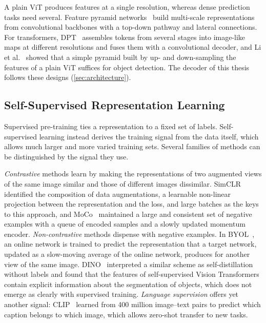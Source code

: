 A plain \acrshort{ViT} produces features at a single resolution, whereas dense prediction
tasks need several. Feature pyramid networks~\cite{lin2017feature} build
multi-scale representations from convolutional backbones with a top-down
pathway and lateral connections. For transformers, DPT~\cite{ranftl2021vision}
assembles tokens from several stages into image-like maps at different
resolutions and fuses them with a convolutional decoder, and Li et
al.~\cite{li2022exploring} showed that a simple pyramid built by up- and
down-sampling the features of a plain \acrshort{ViT} suffices for object detection. The
decoder of this thesis follows these designs (\cref{sec:architecture}).

\subsection{Self-Supervised Representation Learning}\label{sec:ssl}

Supervised pre-training ties a representation to a fixed set of labels.
Self-supervised learning instead derives the training signal from the data
itself, which allows much larger and more varied training sets. Several families
of methods can be distinguished by the signal they use.

\emph{Contrastive} methods learn by making the representations of two augmented
views of the same image similar and those of different images dissimilar.
SimCLR~\cite{chen2020simple} identified the composition of data augmentations,
a learnable non-linear projection between the representation and the loss, and
large batches as the keys to this approach, and MoCo~\cite{he2020momentum}
maintained a large and consistent set of negative examples with a queue of
encoded samples and a slowly updated momentum encoder. \emph{Non-contrastive}
methods dispense with negative examples. In BYOL~\cite{grill2020bootstrap}, an
online network is trained to predict the representation that a target network,
updated as a slow-moving average of the online network, produces for another
view of the same image. DINO~\cite{caron2021emerging} interpreted a similar
scheme as self-distillation without labels and found that the features of
self-supervised Vision Transformers contain explicit information about the
segmentation of objects, which does not emerge as clearly with supervised
training. \emph{Language supervision} offers yet another signal: CLIP~\cite{radford2021learning}
learned from 400 million image--text pairs to predict which caption belongs to
which image, which allows zero-shot transfer to new tasks.

